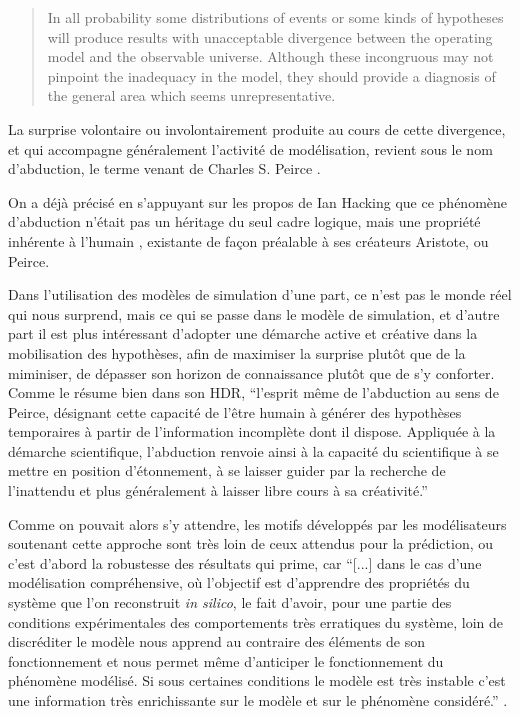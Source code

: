 \foreignblockquote{english}[{\cite[226]{Hermann1967}}]{In all probability some distributions of events or some kinds of hypotheses will produce results with unacceptable divergence between the operating model and the observable universe. Although these incongruous may not pinpoint the inadequacy in the model, they should provide a diagnosis of the general area which seems unrepresentative.} 

La surprise volontaire ou involontairement produite au cours de cette divergence, et qui accompagne généralement l'activité de modélisation, revient sous le nom d'abduction, le terme venant de Charles S. Peirce \autocites{Besse2000, Banos2013, Phan2006, Livet2014}.

On a déjà précisé en s'appuyant sur les propos de Ian Hacking \autocites{Hacking1989,Hacking2003, Hacking2006} que ce phénomène d'abduction n'était pas un héritage du seul cadre logique, mais une propriété inhérente à l'humain , existante de façon préalable à ses créateurs Aristote, ou Peirce.

Dans l'utilisation des modèles de simulation d'une part, ce n'est pas le monde réel qui nous surprend, mais ce qui se passe dans le modèle de simulation, et d'autre part il est plus intéressant d'adopter une démarche active et créative dans la mobilisation des hypothèses, afin de maximiser la surprise plutôt que de la miminiser, de dépasser son horizon de connaissance plutôt que de s'y conforter. Comme le résume bien \textcite{Banos2013} dans son HDR, \enquote{l’esprit même de l’abduction au sens de Peirce, désignant cette capacité de l’être humain à générer des hypothèses temporaires à partir de l’information incomplète dont il dispose. Appliquée à la démarche scientifique, l’abduction renvoie ainsi à la capacité du scientifique à se mettre en position d’étonnement, à se laisser guider par la recherche de l’inattendu et plus généralement à laisser libre cours à sa créativité.}

Comme on pouvait alors s'y attendre, les motifs développés par les modélisateurs soutenant cette approche sont très loin de ceux attendus pour la prédiction, ou c'est d'abord la robustesse des résultats qui prime, car \enquote{[...] dans le cas d’une modélisation compréhensive, où l’objectif est d’apprendre des propriétés du système que l’on reconstruit \textit{in silico}, le fait d’avoir, pour une partie des conditions expérimentales des comportements très erratiques du système, loin de discréditer le modèle nous apprend au contraire des éléments de son fonctionnement et nous permet même d’anticiper le fonctionnement du phénomène modélisé. Si sous certaines conditions le modèle est très instable c’est une information très enrichissante sur le modèle et sur le phénomène considéré.} \autocite{Amblard2010}.

